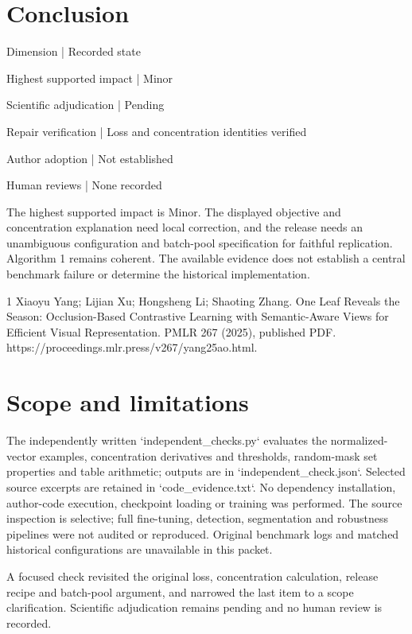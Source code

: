 \documentclass[10pt]{article}
\begin{document}
\section*{Conclusion}
Dimension | Recorded state\par
Highest supported impact | Minor\par
Scientific adjudication | Pending\par
Repair verification | Loss and concentration identities verified\par
Author adoption | Not established\par
Human reviews | None recorded\par
The highest supported impact is Minor. The displayed objective and concentration explanation need local correction, and the release needs an unambiguous configuration and batch-pool specification for faithful replication. Algorithm 1 remains coherent. The available evidence does not establish a central benchmark failure or determine the historical implementation.\par
1 Xiaoyu Yang; Lijian Xu; Hongsheng Li; Shaoting Zhang. One Leaf Reveals the Season: Occlusion-Based Contrastive Learning with Semantic-Aware Views for Efficient Visual Representation. PMLR 267 (2025), published PDF. https://proceedings.mlr.press/v267/yang25ao.html.\par
\section*{Scope and limitations}
The independently written `independent\_checks.py` evaluates the normalized-vector examples, concentration derivatives and thresholds, random-mask set properties and table arithmetic; outputs are in `independent\_check.json`. Selected source excerpts are retained in `code\_evidence.txt`. No dependency installation, author-code execution, checkpoint loading or training was performed. The source inspection is selective; full fine-tuning, detection, segmentation and robustness pipelines were not audited or reproduced. Original benchmark logs and matched historical configurations are unavailable in this packet.\par
A focused check revisited the original loss, concentration calculation, release recipe and batch-pool argument, and narrowed the last item to a scope clarification. Scientific adjudication remains pending and no human review is recorded.\par
\end{document}

